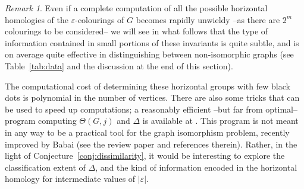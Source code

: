 \documentclass[11pt, a4paper, reqno, twoside, makeidx]{amsart}
\theoremstyle{remark}
\newtheorem{rmk}{Remark}[section]
\theoremstyle{plain}
\theoremstyle{definition}
\begin{document}
\begin{rmk}
Even if a complete computation of all the possible horizontal homologies of the $\varepsilon$-colourings of $G$ becomes rapidly unwieldy --as there are $2^m$ colourings to be considered-- we will see in what follows that the type of information contained in small portions of these invariants is quite subtle, and is on average quite effective in distinguishing between non-isomorphic graphs (see Table~\ref{tab:data} and the discussion at the end of this section).

The computational cost of determining these horizontal groups with few black dots is polynomial in the number of vertices. 
There are also some tricks that can be used to speed up computations; a reasonably efficient --but far from optimal-- program computing $\Theta(G,j)$ and $\Delta$ is available at \cite{miogithub}. This program is not meant in any way to be a practical tool for the graph isomorphism problem, recently  improved by Babai \cite{babai2016graph} (see the review paper \cite{grohe2020graph} and references therein). Rather, in the light of Conjecture~\ref{conj:dissimilarity}, it would be interesting to explore  the classification extent of $\Delta$, and the kind of information encoded in the horizontal homology for intermediate values of $|\varepsilon|$.
\end{rmk}
\end{document}
